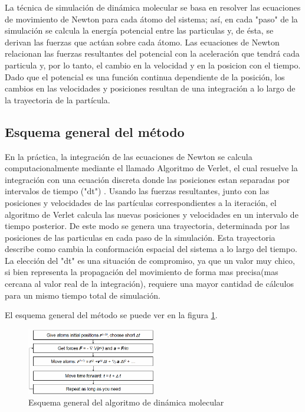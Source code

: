 La técnica de simulación de dinámica molecular se basa en resolver las ecuaciones de movimiento de Newton para cada átomo del sistema; así, en cada "paso" de la simulación se calcula la energía potencial entre las particulas y, de ésta, se derivan las fuerzas que actúan sobre cada átomo. 
Las ecuaciones de Newton relacionan las fuerzas resultantes del potencial con la aceleración que tendrá cada particula y, por lo tanto, el cambio en la velocidad y en la posicion con el tiempo. 
Dado que el potencial es una función continua dependiente de la posición, los cambios en las velocidades y posiciones resultan de una integración a lo largo de la trayectoria de la partícula.


\subsection{Esquema general del método}

En la práctica, la integración de las ecuaciones de Newton se calcula computacionalmente mediante el llamado Algoritmo de Verlet, el cual resuelve la integración con una ecuación discreta donde las posiciones estan separadas por intervalos de tiempo ("dt") . 
Usando las fuerzas resultantes, junto con las posiciones y velocidades de las partículas correspondientes a la iteración, el algoritmo de Verlet calcula las nuevas posiciones y velocidades en un intervalo de tiempo posterior. De este modo se genera una trayectoria, determinada por las posiciones de las particulas en cada paso de la simulación. 
Esta trayectoria describe como cambia la conformación espacial del sistema a lo largo del tiempo. 
La elección del "dt" es una situación de compromiso, ya que un valor muy chico, si bien representa la propagación del movimiento de forma mas precisa(mas cercana al valor real de la integración), requiere una mayor cantidad de cálculos para un mismo tiempo total de simulación. 



El esquema general del método se puede ver en la figura \ref{esquemaMD}.


\begin{figure}[!ht]
\begin{center}
\includegraphics[keepaspectratio, width=0.5\textwidth]{img/mdalgorithm.png}
\end{center}
\caption{Esquema general del algoritmo de dinámica molecular}
\label{esquemaMD}
\end{figure}





